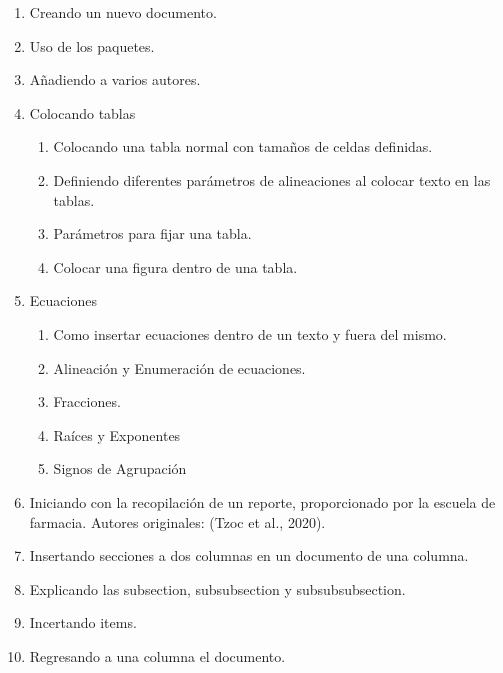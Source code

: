 \documentclass[12pt,letterpaper]{article}
\begin{document}
\begin{enumerate}
    \item Creando un nuevo documento.
    \item Uso de los paquetes.
    \item Añadiendo a varios autores.
    \item Colocando tablas
        \begin{enumerate}
            \item Colocando una tabla normal con tamaños de celdas definidas.
            
            \item Definiendo diferentes parámetros de alineaciones al colocar texto en las tablas.
            
            \item Parámetros para fijar una tabla.
            
            \item Colocar una figura dentro de una tabla.
        \end{enumerate}
    \item Ecuaciones
        \begin{enumerate}
            \item Como insertar ecuaciones dentro de un texto y fuera del mismo.
            \item Alineación y Enumeración de ecuaciones.
            \item Fracciones.
            \item Raíces y Exponentes
            \item Signos de Agrupación
        \end{enumerate}
    \item Iniciando con la recopilación de un reporte, proporcionado por la escuela de farmacia. Autores originales: (Tzoc et al., 2020).
    
    \item Insertando secciones a dos columnas en un documento de una columna.
    
    \item Explicando las subsection, subsubsection y subsubsubsection.
    
    \item Incertando items.
    \item Regresando a una columna el documento.
    

\end{enumerate}
\end{document}
